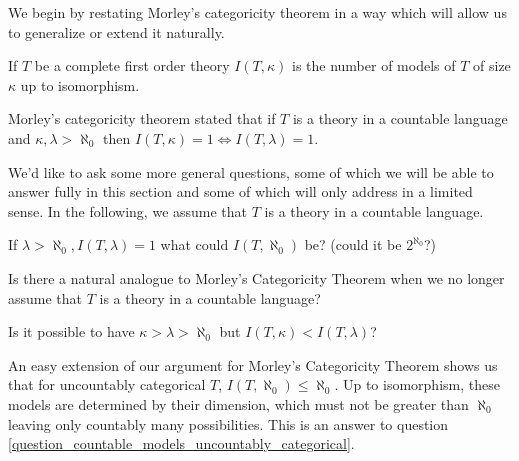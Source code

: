 We begin by restating Morley's categoricity theorem in a way which will allow us to generalize or extend it naturally.

\begin{definition}\label{definition_number_models}
If \(T\) be a complete first order theory \(I(T, \kappa)\) is the number of models of \(T\) of size \(\kappa\) up to isomorphism.
\end{definition}

Morley's categoricity theorem stated that if \(T\) is a theory in a countable language and \(\kappa, \lambda > \aleph_0\) then \(I(T, \kappa) = 1 \iff I(T, \lambda) = 1\). 

We'd like to ask some more general questions, some of which we will be able to answer fully in this section and some of which will only address in a limited sense. 
In the following, we assume that \(T\) is a theory in a countable language. 

\begin{question}\label{question_countable_models_uncountably_categorical}
If \(\lambda > \aleph_0, I(T, \lambda) = 1\) what could \(I(T, \aleph_0)\) be? (could it be \(2^{\aleph_0}\)?)
\end{question}


\begin{question}\label{question_los_conjecture_uncountable_languages}
Is there a natural analogue to Morley's Categoricity Theorem when we no longer assume that \(T\) is a theory in a countable language?
\end{question}

\begin{question}\label{question_morleys_conjecture}
Is it possible to have \(\kappa > \lambda > \aleph_0\) but \(I(T, \kappa) < I(T, \lambda)\)?
\end{question}

An easy extension of our argument for Morley's Categoricity Theorem shows us that for uncountably categorical \(T\), \(I(T, \aleph_0)\leq \aleph_0\).
Up to isomorphism, these models are determined by their dimension, which must not be greater than \(\aleph_0\) leaving only countably many possibilities. 
This is an answer to question \ref{question_countable_models_uncountably_categorical}.

